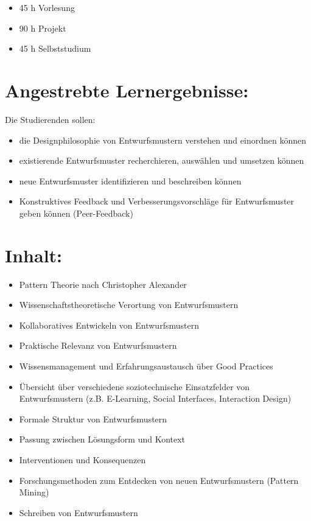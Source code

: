\begin{itemize}
\item
  45 h Vorlesung
\item
  90 h Projekt
\item
  45 h Selbststudium
\end{itemize}

\section*{Angestrebte
Lernergebnisse:}\label{angestrebte-lernergebnisse-12}

Die Studierenden sollen:

\begin{itemize}
\item
  die Designphilosophie von Entwurfsmustern verstehen und einordnen
  können
\item
  existierende Entwurfsmuster recherchieren, auswählen und umsetzen
  können
\item
  neue Entwurfsmuster identifizieren und beschreiben können
\item
  Konstruktives Feedback und Verbesserungsvorschläge für Entwurfsmuster
  geben können (Peer-Feedback)
\end{itemize}

\section*{Inhalt:}\label{inhalt-12}

\begin{itemize}
\item
  Pattern Theorie nach Christopher Alexander
\item
  Wissenschaftstheoretische Verortung von Entwurfsmustern
\item
  Kollaboratives Entwickeln von Entwurfsmustern
\item
  Praktische Relevanz von Entwurfsmustern
\item
  Wissensmanagement und Erfahrungsaustausch über Good Practices
\item
  Übersicht über verschiedene soziotechnische Einsatzfelder von
  Entwurfsmustern (z.B. E-Learning, Social Interfaces, Interaction
  Design)
\item
  Formale Struktur von Entwurfsmustern
\item
  Passung zwischen Lösungsform und Kontext
\item
  Interventionen und Konsequenzen
\item
  Forschungsmethoden zum Entdecken von neuen Entwurfsmustern (Pattern
  Mining)
\item
  Schreiben von Entwurfsmustern
\end{itemize}

